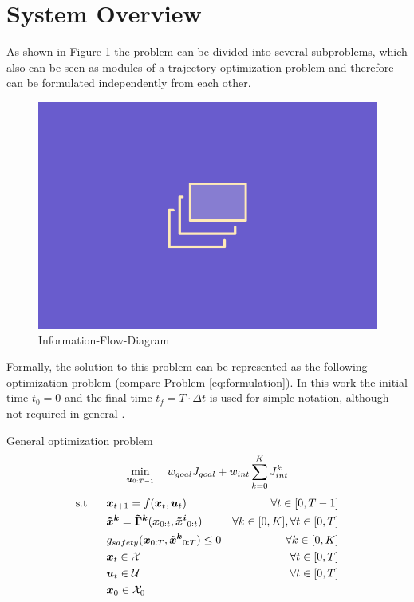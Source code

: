 \section{System Overview}
\label{text:approach/overview}
As shown in Figure \ref{img:information_flow} the problem can be divided into several subproblems, which also can be seen as modules of a trajectory optimization problem and therefore can be formulated independently from each other. 

\begin{figure}[!ht]
\begin{center}
\includegraphics[width=\imgwidth]{images/placeholder.png}
\caption{Information-Flow-Diagram}
\label{img:information_flow}
\end{center}
\end{figure}

Formally, the solution to this problem can be represented as the following optimization problem (compare Problem \ref{eq:formulation}). In this work the initial time $t_0 = 0$ and the final time $t_f = T \cdot \Delta t$ is used for simple notation, although not required in general \cite{Wachter2006}. \\

\begin{problem}{\textrm{General optimization problem}}
\begin{equation}
\min_{\boldsymbol{u}_{0:T-1}} \quad w_{goal} J_{goal} + w_{int} \sum_{k=0}^K J_{int}^k
\end{equation}
\begin{align}
\textrm{s.t. } \quad & \x_{t+1} = \f(\x_t, \u_t) & \forall t \in [0, T - 1] \\
& \xped[k] = \distmodel[k](\x_{0:t}, \xped[i]_{0:t}) & \forall k \in [0, K], \forall t \in [0, T]\\
& g_{safety}(\x_{0:T}, \xped[k]_{0:T}) \leq 0 & \forall k \in [0, K] \\
& \x_t \in \xset & \forall t \in [0, T]\\
& \u_t \in \uset & \forall t \in [0, T]\\
& \x_0 \in \xset_0
\end{align} 
\label{eq:formulation}
\end{problem}

